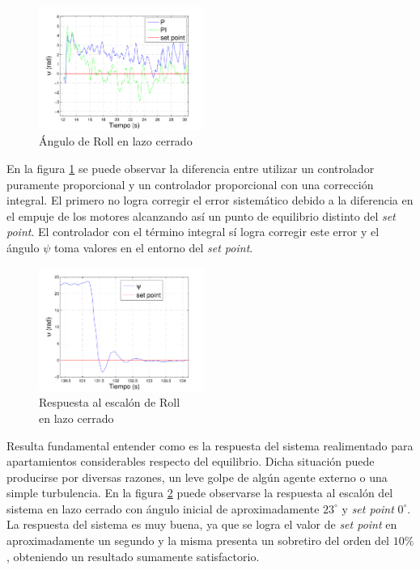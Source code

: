 \documentclass[main]{subfiles}
\begin{document}
\begin{figure}
	\centering
	\includegraphics[width=0.48\textwidth]{./pics_test_control/psi_sin_con_int.pdf}
	\caption{\'Angulo de Roll en lazo cerrado}
	\label{fig:psi_sin_con_int}
\end{figure}

En la figura \ref{fig:psi_sin_con_int} se puede observar la diferencia entre utilizar un controlador puramente proporcional y un controlador proporcional con una correcci\'on integral. El primero no logra corregir el error sistem\'atico debido a la diferencia en el empuje de los motores alcanzando as\'i un punto de equilibrio distinto del \emph{set point}. El controlador con el t\'ermino integral s\'i logra corregir este error y el \'angulo $\psi$ toma valores en el entorno del \emph{set point}.\\


\begin{figure}
	\vspace{-10pt}
	\centering
	\includegraphics[width=0.48\textwidth]{./pics_test_control/psi_esc.pdf}
	\caption{Respuesta al escal\'on de Roll\\ en lazo cerrado}
	\label{fig:psi_esc}
\end{figure}

Resulta fundamental entender como es la respuesta del sistema realimentado para apartamientos considerables respecto del equilibrio. Dicha situaci\'on puede producirse por diversas razones, un leve golpe de alg\'un agente externo o una simple turbulencia. En la figura \ref{fig:psi_esc} puede observarse la respuesta al escal\'on del sistema en lazo cerrado	con \'angulo inicial de aproximadamente $23 ^\circ$ y \emph{set point} $0 ^\circ$. La respuesta del sistema es muy buena, ya que se logra el valor de \emph{set point} en aproximadamente un segundo y la misma presenta un sobretiro del orden del $10\%$, obteniendo un resultado sumamente satisfactorio.\\
\end{document}
